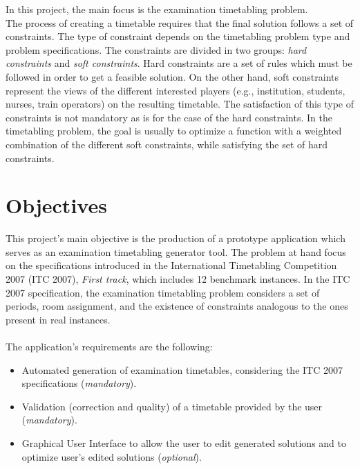 In this project, the main focus is the examination timetabling problem. \\

The process of creating a timetable requires that the final solution follows a set of constraints. The type of constraint depends on the timetabling problem type and problem specifications. The constraints are divided in two groups: \textit{hard constraints} and \textit{soft constraints}. Hard constraints are a set of rules which must be followed in order to get a feasible solution. On the other hand, soft constraints represent the views of the different interested players (e.g., institution, students, nurses, train operators) on the resulting timetable. The satisfaction of this type of constraints is not mandatory as is for the case of the hard constraints. In the timetabling problem, the goal is usually to optimize a function with a weighted combination of the different soft constraints, while satisfying the set of hard constraints. 

\section{Objectives}
\label{section:Objts}

This project's main objective is the production of a prototype application which serves as an examination timetabling generator tool. The problem at hand focus on the specifications introduced in the International Timetabling Competition 2007 (ITC 2007), \textit{First track}, which includes 12 benchmark instances. In the ITC 2007 specification, the examination timetabling problem considers a set of periods, room assignment, and the existence of constraints analogous to the ones present in real instances.\\
\\
The application's requirements are the following:

\begin{itemize}
	\item Automated generation of examination timetables, considering the ITC 2007 specifications (\textit{mandatory}).
	\item Validation (correction and quality) of a timetable provided by the user (\textit{mandatory}).
	\item Graphical User Interface to allow the user to edit generated solutions and to optimize user's edited solutions (\textit{optional}).
\end{itemize}

